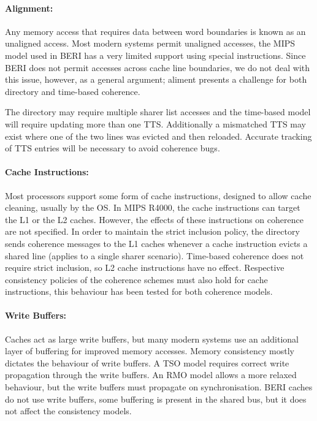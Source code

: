 	\paragraph{Alignment:} Any memory access that requires data between word boundaries is known as an unaligned access. Most modern systems permit unaligned accesses, the MIPS model used in BERI has a very limited support using special instructions. Since BERI does not permit accesses across cache line boundaries, we do not deal with this issue, however, as a general argument; aliment presents a challenge for both directory and time-based coherence. 
	
	The directory may require multiple sharer list accesses and the time-based model will require updating more than one TTS. Additionally a mismatched TTS may exist where one of the two lines was evicted and then reloaded. Accurate tracking of TTS entries will be necessary to avoid coherence bugs.
	
	\paragraph{Cache Instructions:} Most processors support some form of cache instructions, designed to allow cache cleaning, usually by the OS. In MIPS R4000, the cache instructions can target the L1 or the L2 caches. However, the effects of these instructions on coherence are not specified. In order to maintain the strict inclusion policy, the directory sends coherence messages to the L1 caches whenever a cache instruction evicts a shared line (applies to a single sharer scenario). Time-based coherence does not require strict inclusion, so L2 cache instructions have no effect. Respective consistency policies of the coherence schemes must also hold for cache instructions, this behaviour has been tested for both coherence models.
	
	\paragraph{Write Buffers:} Caches act as large write buffers, but many modern systems use an additional layer of buffering for improved memory accesses. Memory consistency mostly dictates the behaviour of write buffers. A TSO model requires correct write propagation through the write buffers. An RMO model allows a more relaxed behaviour, but the write buffers must propagate on synchronisation. BERI caches do not use write buffers, some buffering is present in the shared bus, but it does not affect the consistency models.
	
